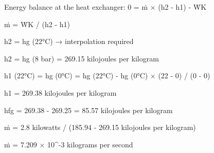 Energy balance at the heat exchanger:  
0 = ṁ × (h2 - h1) - ẆK  

ṁ = ẆK / (h2 - h1)  

h2 = hg (22°C) → interpolation required  

h2 = hg (8 bar) = 269.15 kilojoules per kilogram  

h1 (22°C) = hg (0°C) = hg (22°C) - hg (0°C) × (22 - 0) / (0 - 0)  

h1 = 269.38 kilojoules per kilogram  

hfg = 269.38 - 269.25 = 85.57 kilojoules per kilogram  

ṁ = 2.8 kilowatts / (185.94 - 269.15 kilojoules per kilogram)  

ṁ = 7.209 × 10^-3 kilograms per second